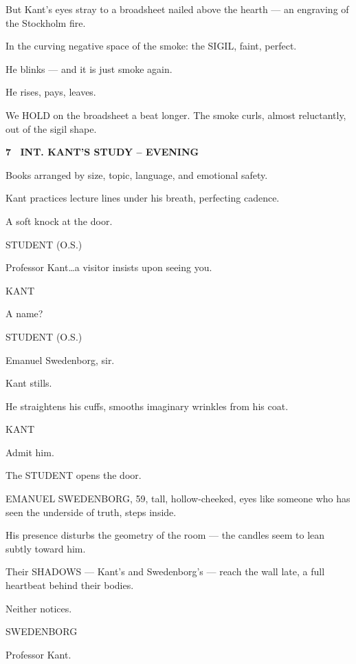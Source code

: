 \documentclass[12pt]{article}
\newcommand{\scene}[2]{%
  \vspace{1.8\baselineskip}%
  \noindent\textbf{#1 \ #2}\par\vspace{0.4\baselineskip}%
}
\newenvironment{dialogue}[1]{%
  \vspace{0.8\baselineskip}%
  \noindent\hspace*{2.3in}\textsc{#1}\par%
  \noindent\hspace*{1.5in}\begin{minipage}[t]{4.5in}%
}{%
  \end{minipage}\par%
}
\begin{document}
But Kant's eyes stray to a broadsheet nailed above the hearth --- an
engraving of the Stockholm fire.

In the curving negative space of the smoke: the SIGIL, faint, perfect.

He blinks --- and it is just smoke again.

He rises, pays, leaves.

We HOLD on the broadsheet a beat longer. The smoke curls, almost
reluctantly, out of the sigil shape.


\scene{7}{INT. KANT'S STUDY -- EVENING}

Books arranged by size, topic, language, and emotional safety.

Kant practices lecture lines under his breath, perfecting cadence.

A soft knock at the door.

\begin{dialogue}{STUDENT (O.S.)}
Professor Kant\ldots a visitor insists upon seeing you.
\end{dialogue}

\begin{dialogue}{KANT}
A name?
\end{dialogue}

\begin{dialogue}{STUDENT (O.S.)}
Emanuel Swedenborg, sir.
\end{dialogue}

Kant stills.

He straightens his cuffs, smooths imaginary wrinkles from his coat.

\begin{dialogue}{KANT}
Admit him.
\end{dialogue}

The STUDENT opens the door.

EMANUEL SWEDENBORG, 59, tall, hollow-cheeked, eyes like someone who has
seen the underside of truth, steps inside.

His presence disturbs the geometry of the room --- the candles seem to
lean subtly toward him.

Their SHADOWS --- Kant's and Swedenborg's --- reach the wall late, a
full heartbeat behind their bodies.

Neither notices.

\begin{dialogue}{SWEDENBORG}
Professor Kant.
\end{dialogue}
\end{document}
